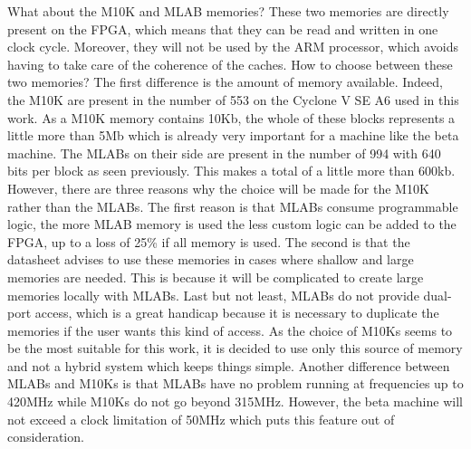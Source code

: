 What about the M10K and MLAB memories? These two memories are directly present on the FPGA, which
 means that they can be read and written in one clock cycle. Moreover, they will not be used by the 
 ARM processor, which avoids having to take care of the coherence of the caches. How to choose 
 between these two memories? The first difference is the amount of memory available. Indeed, the 
 M10K are present in the number of 553 on the Cyclone V SE A6 used in this work. As a M10K memory 
 contains 10Kb, the whole of these blocks represents a little more than 5Mb which is already very 
 important for a machine like the beta machine. The MLABs on their side are present in the number of 
 994 with 640 bits per block as seen previously. This makes a total of a little more than 600kb. 
 However, there are three reasons why the choice will be made for the M10K rather than the MLABs. 
 The first reason is that MLABs consume programmable logic, the more MLAB memory is used the less 
 custom logic can be added to the FPGA, up to a loss of 25\% if all memory is used. The second is 
 that the datasheet advises to use these memories in cases where shallow and large memories are 
 needed. This is because it will be complicated to create large memories locally with MLABs. Last 
 but not least, MLABs do not provide dual-port access, which is a great handicap because it is 
 necessary to duplicate the memories if the user wants this kind of access. As the choice of M10Ks 
 seems to be the most suitable for this work, it is decided to use only this source of memory and 
 not a hybrid system which keeps things simple. Another difference between MLABs and M10Ks is that 
 MLABs have no problem running at frequencies up to 420MHz while M10Ks do not go beyond 315MHz. 
 However, the beta machine will not exceed a clock limitation of 50MHz which puts this feature out 
 of consideration.